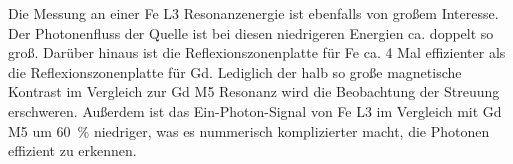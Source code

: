 \noindent
Die Messung an einer Fe L3 Resonanzenergie ist ebenfalls von großem Interesse. Der Photonenfluss der Quelle ist bei diesen niedrigeren Energien ca. doppelt so groß. Darüber hinaus ist die Reflexionszonenplatte für Fe ca. 4 Mal effizienter als die Reflexionszonenplatte für Gd. Lediglich der halb so große magnetische Kontrast im Vergleich zur Gd M5 Resonanz wird die Beobachtung der Streuung erschweren. Außerdem ist das Ein-Photon-Signal von Fe L3 im Vergleich mit Gd M5 um \SI{60}{\percent} niedriger, was es nummerisch komplizierter macht, die Photonen effizient zu erkennen.  




%     



